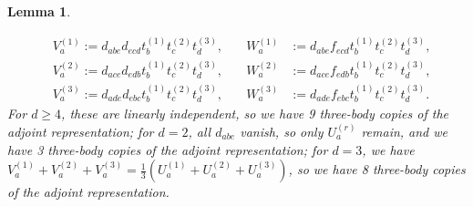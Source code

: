 \documentclass[11pt,letterpaper]{article}
\theoremstyle{plain}
\theoremstyle{plain}
\theoremstyle{plain}
\theoremstyle{plain}
\theoremstyle{plain}
\theoremstyle{plain}
\theoremstyle{plain}
\newtheorem{smlemma}[smtheorem]{Lemma}
\theoremstyle{definition}
\theoremstyle{plain}
\begin{document}
\begin{smlemma}
\begin{itemize}
\[        \]
        \[
            \begin{aligned}
            & V_a^{(1)}:=d_{a b e} d_{e c d} t_b^{(1)} t_c^{(2)} t_d^{(3)}, \\
            & V_a^{(2)}:=d_{a c e} d_{e d b} t_b^{(1)} t_c^{(2)} t_d^{(3)}, \\
            & V_a^{(3)}:=d_{a d e} d_{e b c} t_b^{(1)} t_c^{(2)} t_d^{(3)},
            \end{aligned}\quad
            \begin{aligned}
            W_a^{(1)} & :=d_{a b e} f_{e c d} t_b^{(1)} t_c^{(2)} t_d^{(3)}, \\
            W_a^{(2)} & :=d_{a c e} f_{e d b} t_b^{(1)} t_c^{(2)} t_d^{(3)}, \\
            W_a^{(3)} & :=d_{a d e} f_{e b c} t_b^{(1)} t_c^{(2)} t_d^{(3)} .
            \end{aligned}
        \]
        For $d\geq 4$, these are linearly independent, so we have 9 three-body copies of the adjoint representation; for $d=2$, all $d_{a b e}$ vanish, so only $U_a^{(r)}$ remain, 
        and we have 3 three-body copies of the adjoint representation;
        for $d=3$, we have $V_a^{(1)}+V_a^{(2)}+V_a^{(3)}=\frac{1}{3}\left(U_a^{(1)}+U_a^{(2)}+U_a^{(3)}\right)$, so we have 8 three-body copies of the adjoint representation.
    \end{itemize}
\end{smlemma}
\end{document}

